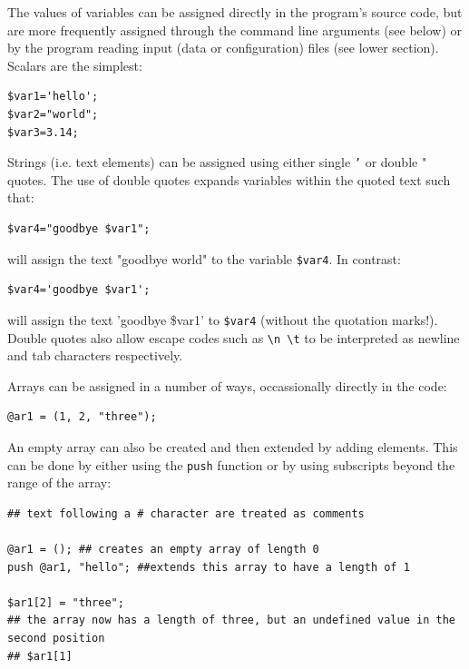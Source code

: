 \documentclass[11pt]{article}
\begin{document}
The values of variables can be assigned directly in the program's source
code, but are more frequently assigned through the command line
arguments (see below) or by the program reading input (data or
configuration) files (see lower section). Scalars are the simplest:

\begin{verbatim}
$var1='hello'; 
$var2="world";
$var3=3.14;
\end{verbatim}

Strings (i.e. text elements) can be assigned using either single \texttt{’} or
double " quotes. The use of double quotes expands variables within the
quoted text such that:

\begin{verbatim}
$var4="goodbye $var1";
\end{verbatim}

will assign the text "goodbye world" to the variable \texttt{\$var4}.
In contrast:

\begin{verbatim}
$var4='goodbye $var1';
\end{verbatim}

will assign the text 'goodbye \$var1' to \texttt{\$var4} (without the quotation
marks!).
Double quotes also allow escape codes such as \texttt{\textbackslash{}n \textbackslash{}t} to be interpreted
as newline and tab characters respectively.

Arrays can be assigned in a number of ways, occassionally directly in
the code:

\begin{verbatim}
@ar1 = (1, 2, "three");
\end{verbatim}

An empty array can also be created and then extended by adding elements.
This can be done by either using the \texttt{push} function or by using
subscripts beyond the range of the array:

\begin{verbatim}
## text following a # character are treated as comments

@ar1 = (); ## creates an empty array of length 0 
push @ar1, "hello"; ##extends this array to have a length of 1

$ar1[2] = "three"; 
## the array now has a length of three, but an undefined value in the second position 
## $ar1[1]
\end{verbatim}
\end{document}
